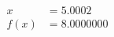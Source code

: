 \documentclass[preview]{standalone}
\begin{document}
\begin{align*}
x &= 5.0002\\f(x) &= 8.0000000
\end{align*}
\end{document}
